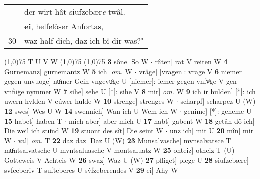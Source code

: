 \documentclass[8pt,a4paper,notitlepage]{article}
\begin{document}
\begin{table}[ht]
\begin{minipage}[t]{0.5\linewidth}
\begin{tabular}{rl}
 & der wirt hât siufzebær\textit{e} twâl.\\ 
 & \textbf{ei}, helfelôser Anfortas,\\ 
30 & waz half dich, daz ich bî dir was?"\\ 
\end{tabular}
\scriptsize
\line(1,0){75} \newline
T U V W \newline
\line(1,0){75} \newline
\newline
\line(1,0){75} \newline
\textbf{3} sône] So W  $\cdot$ râten] rat V reiten W \textbf{4} Gurnemanz] gurnemantz W \textbf{5} ich] \textit{om.} W  $\cdot$ vrâge] [vragen]: vrage V \textbf{6} niemer gegen unvuoge] nuͦmer Gein vngevuͦge U [niemer]: iemer gegen vnfvͦge V gen vnfuͦge nymmer W \textbf{7} sihe] sehe U [*]: sihe V \textbf{8} mir] \textit{om.} W \textbf{9} ich ir hulden] [*]: ich uwern hvlden V eúwer hulde W \textbf{10} strenge] strenges W  $\cdot$ scharpf] scharpez U (W) \textbf{12} swes] Wes U W \textbf{14} swennich] Wan ich U Wem ich W  $\cdot$ genime] [*]: geneme U \textbf{15} habet] haben T  $\cdot$ mich aber] aber mich U \textbf{17} habt] gabent W \textbf{18} getân dô ich] Die weil ich stuͦnd W \textbf{19} stuont des sît] Die seint W  $\cdot$ unz ich] mit U \textbf{20} mîn] mir W  $\cdot$ val] \textit{om.} T \textbf{22} daz daz] Daz U (W) \textbf{23} Munsalvasche] mvnsalvatsce T muͦntsalvatsche U mvntsaluasche V montsaluatz W \textbf{25} ohteiz] otheiz T (U) Gotteweis V Achteis W \textbf{26} swaz] Waz U (W) \textbf{27} pfliget] plege U \textbf{28} siufzebære] svfceberiv T sufteberes U sv́fzeberendes V \textbf{29} ei] Ahy W \newline
\end{minipage}
\end{table}
\end{document}
